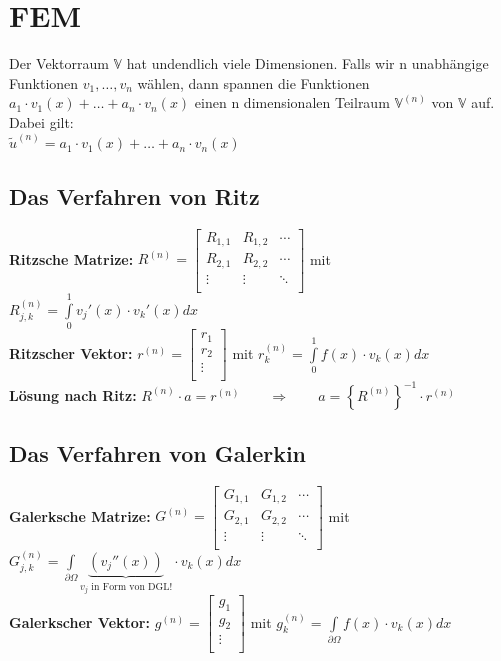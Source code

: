 \clearpage
\section{FEM}

Der Vektorraum $\mathbb{V}$ hat undendlich viele Dimensionen. Falls wir n unabhängige Funktionen $v_1,\ldots,v_n$ wählen, dann spannen die Funktionen $a_1\cdot v_1(x)+\ldots+a_n\cdot v_n(x)$ einen n dimensionalen Teilraum $\mathbb{V}^{(n)}$  von $\mathbb{V}$ auf. Dabei gilt:\\

$\boxed{\tilde{u}^{(n)}=a_1\cdot v_1(x)+\ldots+a_n\cdot v_n(x)}$
\subsection{Das Verfahren von Ritz}
\textbf{Ritzsche Matrize: }
$R^{(n)}=\begin{bmatrix}
	R_{1,1}& R_{1,2}&\cdots\\
	R_{2,1}& R_{2,2}&\cdots\\
	\vdots & \vdots &\ddots\\
\end{bmatrix}$ \qquad mit \qquad $R_{j,k}^{(n)}=\int\limits_{0}^{1}{v_j'(x)\cdot
v_k'(x) dx}$\\
\textbf{Ritzscher Vektor: } 
$r^{(n)}=\begin{bmatrix}
	r_1\\
	r_2\\
	\vdots\\
\end{bmatrix}$ \qquad mit \qquad $r_{k}^{(n)}=\int\limits_{0}^{1}{f(x)\cdot v_k(x) dx}$\\

\textbf{Lösung nach Ritz:} $R^{(n)}\cdot a=r^{(n)}\qquad \Rightarrow \qquad a=\left\{R^{(n)}\right\}^{-1}\cdot r^{(n)}$
\subsection{Das Verfahren von Galerkin}
\textbf{Galerksche Matrize: }
$G^{(n)}=\begin{bmatrix}
	G_{1,1}& G_{1,2}&\cdots\\
	G_{2,1}& G_{2,2}&\cdots\\
	\vdots & \vdots &\ddots\\
\end{bmatrix}$ \qquad mit \qquad $G_{j,k}^{(n)}=\int\limits_{\partial \Omega}{\underbrace{(v_j''(x))}_{v_j \text{ in Form von DGL!}}\cdot v_k(x) dx}$\\
\textbf{Galerkscher Vektor: } 
$g^{(n)}=\begin{bmatrix}
	g_1\\
	g_2\\
	\vdots\\
\end{bmatrix}$ \qquad mit \qquad $g_{k}^{(n)}=\int\limits_{\partial \Omega}{f(x)\cdot v_k(x) dx}$\\

